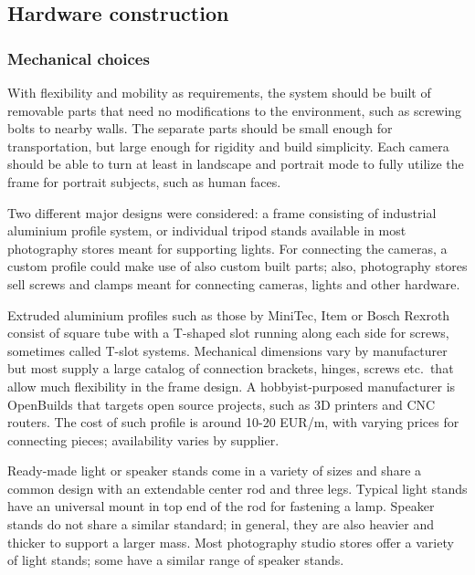

\subsection{Hardware construction} %

\subsubsection{Mechanical choices}

With flexibility and mobility as requirements, the system should be built of removable parts that need no modifications to the environment, such as screwing bolts to nearby walls.
The separate parts should be small enough for transportation, but large enough for rigidity and build simplicity.
Each camera should be able to turn at least in landscape and portrait mode to fully utilize the frame for portrait subjects, such as human faces.

Two different major designs were considered: a frame consisting of industrial aluminium profile system, or individual tripod stands available in most photography stores meant for supporting lights.
For connecting the cameras, a custom profile could make use of also custom built parts; also, photography stores sell screws and clamps meant for connecting cameras, lights and other hardware.

Extruded aluminium profiles such as those by MiniTec, Item or Bosch Rexroth consist of square tube with a T-shaped slot running along each side for screws, sometimes called T-slot systems.
Mechanical dimensions vary by manufacturer but most supply a large catalog of connection brackets, hinges, screws etc.\ that allow much flexibility in the frame design.
A hobbyist-purposed manufacturer is OpenBuilds that targets open source projects, such as 3D printers and CNC routers.
The cost of such profile is around 10-20 EUR/m, with varying prices for connecting pieces; availability varies by supplier.

Ready-made light or speaker stands come in a variety of sizes and share a common design with an extendable center rod and three legs.
Typical light stands have an universal mount in top end of the rod for fastening a lamp.
Speaker stands do not share a similar standard; in general, they are also heavier and thicker to support a larger mass.
Most photography studio stores offer a variety of light stands; some have a similar range of speaker stands.

